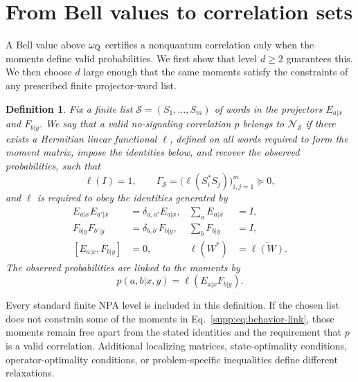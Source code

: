 \documentclass[aps,prl,onecolumn,10pt,superscriptaddress,nofootinbib,longbibliography]{revtex4-2}
\newtheorem{definition}[theorem]{Definition}
\theoremstyle{remark}
\begin{document}
\section{From Bell values to correlation sets}
\label{supp:sec:transfer}

A Bell value above $\omega_{\rm Q}$ certifies a nonquantum correlation only when the moments define valid probabilities. We first show that level $d\geq2$ guarantees this. We then choose $d$ large enough that the same moments satisfy the constraints of any prescribed finite projector-word list.

\begin{definition}
\label{supp:def:finite-word-relaxation}
Fix a finite list $\mathcal S=(S_1,\ldots,S_m)$ of words in the projectors $E_{a|x}$ and $F_{b|y}$. We say that a valid no-signaling correlation $p$ belongs to $\mathcal N_{\mathcal S}$ if there exists a Hermitian linear functional $\ell$, defined on all words required to form the moment matrix, impose the identities below, and recover the observed probabilities, such that
\begin{equation}
\ell(I)=1,
\qquad
\Gamma_{\mathcal S}=\bigl(\ell(S_i^*S_j)\bigr)_{i,j=1}^{m}\succeq0,
\label{supp:eq:selected-moment-matrix}
\end{equation}
and $\ell$ is required to obey the identities generated by
\begin{align}
E_{a|x}E_{a'|x}&=\delta_{a,a'}E_{a|x},
&\sum_aE_{a|x}&=I,
\label{supp:eq:alice-projector-identities}\\
F_{b|y}F_{b'|y}&=\delta_{b,b'}F_{b|y},
&\sum_bF_{b|y}&=I,
\label{supp:eq:bob-projector-identities}\\
[E_{a|x},F_{b|y}]&=0,
&\ell(W^*)&=\overline{\ell(W)}.
\label{supp:eq:cross-and-adjoint}
\end{align}
The observed probabilities are linked to the moments by
\begin{equation}
p(a,b|x,y)=\ell(E_{a|x}F_{b|y}).
\label{supp:eq:behavior-link}
\end{equation}
\end{definition}

Every standard finite NPA level is included in this definition. If the chosen list does not constrain some of the moments in Eq.~\eqref{supp:eq:behavior-link}, those moments remain free apart from the stated identities and the requirement that $p$ is a valid correlation. Additional localizing matrices, state-optimality conditions, operator-optimality conditions, or problem-specific inequalities define different relaxations.
\end{document}
